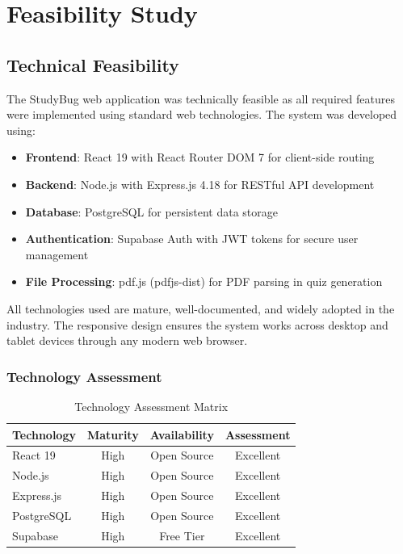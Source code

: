     \chapter{Feasibility Study}
        \section{Technical Feasibility}
            The StudyBug web application was technically feasible as all required features were implemented using standard web technologies. The system was developed using:

            \begin{itemize}
                \item \textbf{Frontend}: React 19 with React Router DOM 7 for client-side routing
                \item \textbf{Backend}: Node.js with Express.js 4.18 for RESTful API development
                \item \textbf{Database}: PostgreSQL for persistent data storage
                \item \textbf{Authentication}: Supabase Auth with JWT tokens for secure user management
                \item \textbf{File Processing}: pdf.js (pdfjs-dist) for PDF parsing in quiz generation
            \end{itemize}

            All technologies used are mature, well-documented, and widely adopted in the industry. The responsive design ensures the system works across desktop and tablet devices through any modern web browser.

            \subsection{Technology Assessment}
            \begin{table}[h]
            \centering
            \begin{tabular}{|l|c|c|c|}
            \hline
            \textbf{Technology} & \textbf{Maturity} & \textbf{Availability} & \textbf{Assessment} \\
            \hline
            React 19 & High & Open Source & Excellent \\
            Node.js & High & Open Source & Excellent \\
            Express.js & High & Open Source & Excellent \\
            PostgreSQL & High & Open Source & Excellent \\
            Supabase & High & Free Tier & Excellent \\
            \hline
            \end{tabular}
            \caption{Technology Assessment Matrix}
            \end{table}


